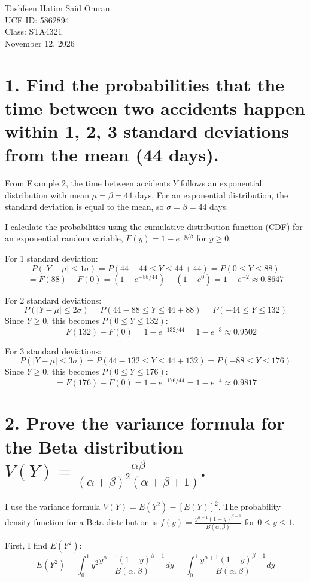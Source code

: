 \documentclass[12pt]{article}
\begin{document}
\noindent
Tashfeen Hatim Said Omran\\
UCF ID: 5862894\\
Class: STA4321\\
November 12, 2026

\vspace{1cm}

\section*{\textbf{1. Find the probabilities that the time between two accidents happen within 1, 2, 3 standard deviations from the mean (44 days).}}

From Example 2, the time between accidents $Y$ follows an exponential distribution with mean $\mu = \beta = 44$ days. For an exponential distribution, the standard deviation is equal to the mean, so $\sigma = \beta = 44$ days.

I calculate the probabilities using the cumulative distribution function (CDF) for an exponential random variable, $F(y) = 1 - e^{-y/\beta}$ for $y \ge 0$.

For 1 standard deviation:
$$P(|Y - \mu| \le 1\sigma) = P(44 - 44 \le Y \le 44 + 44) = P(0 \le Y \le 88)$$
$$= F(88) - F(0) = (1 - e^{-88/44}) - (1 - e^0) = 1 - e^{-2} \approx 0.8647$$

For 2 standard deviations:
$$P(|Y - \mu| \le 2\sigma) = P(44 - 88 \le Y \le 44 + 88) = P(-44 \le Y \le 132)$$
Since $Y \ge 0$, this becomes $P(0 \le Y \le 132)$:
$$= F(132) - F(0) = 1 - e^{-132/44} = 1 - e^{-3} \approx 0.9502$$

For 3 standard deviations:
$$P(|Y - \mu| \le 3\sigma) = P(44 - 132 \le Y \le 44 + 132) = P(-88 \le Y \le 176)$$
Since $Y \ge 0$, this becomes $P(0 \le Y \le 176)$:
$$= F(176) - F(0) = 1 - e^{-176/44} = 1 - e^{-4} \approx 0.9817$$

\vspace{1cm}

\section*{\textbf{2. Prove the variance formula for the Beta distribution} $V(Y) = \frac{\alpha\beta}{(\alpha+\beta)^2(\alpha+\beta+1)}$.}

I use the variance formula $V(Y) = E(Y^2) - [E(Y)]^2$. The probability density function for a Beta distribution is $f(y) = \frac{y^{\alpha-1}(1-y)^{\beta-1}}{B(\alpha,\beta)}$ for $0 \le y \le 1$.

First, I find $E(Y^2)$:
$$E(Y^2) = \int_{0}^{1} y^2 \frac{y^{\alpha-1}(1-y)^{\beta-1}}{B(\alpha,\beta)} dy = \int_{0}^{1} \frac{y^{\alpha+1}(1-y)^{\beta-1}}{B(\alpha,\beta)} dy$$
\end{document}
